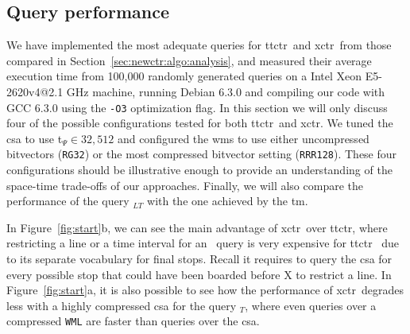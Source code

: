     \subsection{Query performance}
    \label{sec:newctr:exp:time}
    We have implemented the most adequate queries for \gls{ttctr}~and \gls{xctr}~from those compared in Section~\ref{sec:newctr:algo:analysis}, and measured their average execution time from 100,000 randomly generated queries on a Intel Xeon E5-2620v4@2.1 GHz machine, running Debian 6.3.0 and compiling our code with GCC 6.3.0 using the \texttt{-O3} optimization flag. In this section we will only discuss four of the possible configurations tested for both \gls{ttctr}~and \gls{xctr}. We tuned the \gls{csa} to use t$_{\Psi} \in {32,512}$ and configured the \gls{wm}s to use either uncompressed bitvectors (\texttt{RG32}) or the most compressed bitvector setting (\texttt{RRR128}). These four configurations should be illustrative enough to provide an understanding of the \mbox{space-time} \mbox{trade-offs} of our approaches. Finally, we will also compare the performance of the query \boardX$_{LT}$ with the one achieved by the \gls{tm}.
    
    In Figure~\ref{fig:start}b, we can see the main advantage of \gls{xctr}~over \gls{ttctr}, where restricting a line or a time interval for an \endX~query is very expensive for \gls{ttctr}~ due to its separate vocabulary for final stops. Recall it requires to query the \gls{csa} for every possible stop that could have been boarded before X to restrict a line. In Figure~\ref{fig:start}a, it is also possible to see how the performance of \gls{xctr}~degrades less with a highly compressed \gls{csa} for the query \startX$_T$, where even queries over a compressed \texttt{WML} are faster than queries over the \gls{csa}.
    

